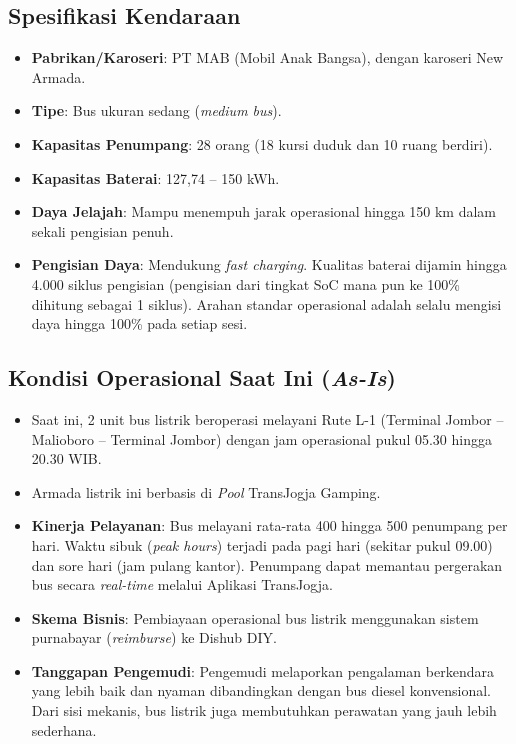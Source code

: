 \subsection*{Spesifikasi Kendaraan}
\begin{itemize}
    \item \textbf{Pabrikan/Karoseri}: PT MAB (Mobil Anak Bangsa), dengan karoseri New Armada.
    \item \textbf{Tipe}: Bus ukuran sedang (\textit{medium bus}).
    \item \textbf{Kapasitas Penumpang}: 28 orang (18 kursi duduk dan 10 ruang berdiri).
    \item \textbf{Kapasitas Baterai}: 127,74 -- 150 kWh.
    \item \textbf{Daya Jelajah}: Mampu menempuh jarak operasional hingga 150 km dalam sekali pengisian penuh.
    \item \textbf{Pengisian Daya}: Mendukung \textit{fast charging}. Kualitas baterai dijamin hingga 4.000 siklus pengisian (pengisian dari tingkat SoC mana pun ke 100\% dihitung sebagai 1 siklus). Arahan standar operasional adalah selalu mengisi daya hingga 100\% pada setiap sesi.
\end{itemize}

\subsection*{Kondisi Operasional Saat Ini (\textit{As-Is})}
\begin{itemize}
    \item Saat ini, 2 unit bus listrik beroperasi melayani Rute L-1 (Terminal Jombor -- Malioboro -- Terminal Jombor) dengan jam operasional pukul 05.30 hingga 20.30 WIB.
    \item Armada listrik ini berbasis di \textit{Pool} TransJogja Gamping.
    \item \textbf{Kinerja Pelayanan}: Bus melayani rata-rata 400 hingga 500 penumpang per hari. Waktu sibuk (\textit{peak hours}) terjadi pada pagi hari (sekitar pukul 09.00) dan sore hari (jam pulang kantor). Penumpang dapat memantau pergerakan bus secara \textit{real-time} melalui Aplikasi TransJogja.
    \item \textbf{Skema Bisnis}: Pembiayaan operasional bus listrik menggunakan sistem purnabayar (\textit{reimburse}) ke Dishub DIY.
    \item \textbf{Tanggapan Pengemudi}: Pengemudi melaporkan pengalaman berkendara yang lebih baik dan nyaman dibandingkan dengan bus diesel konvensional. Dari sisi mekanis, bus listrik juga membutuhkan perawatan yang jauh lebih sederhana.
\end{itemize}

